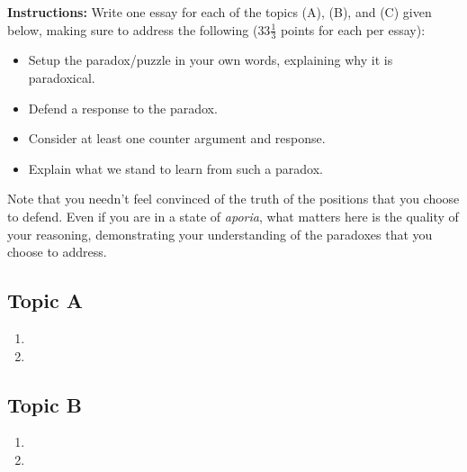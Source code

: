 \documentclass[12pt,letterpaper]{article}
\begin{document}

\vspace{.2in}

\noindent
\textbf{Instructions:} 
Write one essay for each of the topics (A), (B), and (C) given below, making sure to address the following ($33\frac{1}{3}$ points for each per essay):
\begin{itemize}
  \item Setup the paradox/puzzle in your own words, explaining why it is paradoxical.
  \item Defend a response to the paradox.
  \item Consider at least one counter argument and response.
  \item Explain what we stand to learn from such a paradox.
\end{itemize}
Note that you needn't feel convinced of the truth of the positions that you choose to defend.
Even if you are in a state of \textit{aporia}, what matters here is the quality of your reasoning, demonstrating your understanding of the paradoxes that you choose to address.

\vspace{.1in}



\subsection*{Topic A}

\begin{enumerate}
  \item 
    \answer{
    }
  \item 
    \answer{
    }
\end{enumerate}




\subsection*{Topic B}

\begin{enumerate}
  \item 
    \answer{
    }
  \item 
    \answer{
    }
\end{enumerate}
\end{document}
